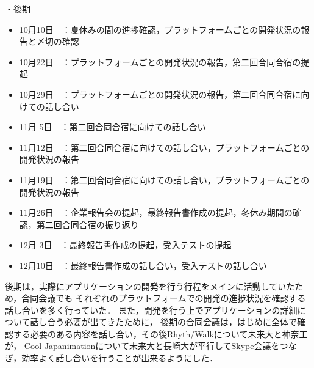 \par
・後期
\begin{itemize}
\item 10月10日　：夏休みの間の進捗確認，プラットフォームごとの開発状況の報告と〆切の確認
\item 10月22日　：プラットフォームごとの開発状況の報告，第二回合同合宿の提起
\item 10月29日　：プラットフォームごとの開発状況の報告，第二回合同合宿に向けての話し合い
\item 11月 5日　：第二回合同合宿に向けての話し合い
\item 11月12日　：第二回合同合宿に向けての話し合い，プラットフォームごとの開発状況の報告
\item 11月19日　：第二回合同合宿に向けての話し合い，プラットフォームごとの開発状況の報告
\item 11月26日　：企業報告会の提起，最終報告書作成の提起，冬休み期間の確認，第二回合同合宿の振り返り
\item 12月 3日　：最終報告書作成の提起，受入テストの提起
\item 12月10日　：最終報告書作成の話し合い，受入テストの話し合い
\end{itemize}

後期は，実際にアプリケーションの開発を行う行程をメインに活動していたため，合同会議でも
それぞれのプラットフォームでの開発の進捗状況を確認する話し合いを多く行っていた．
また，開発を行う上でアプリケーションの詳細について話し合う必要が出てきたために，
後期の合同会議は，はじめに全体で確認する必要のある内容を話し合い，その後Rhyth/Walkについて未来大と神奈工が，
Cool Japanimationについて未来大と長崎大が平行してSkype会議をつなぎ，効率よく話し合いを行うことが出来るようにした．
